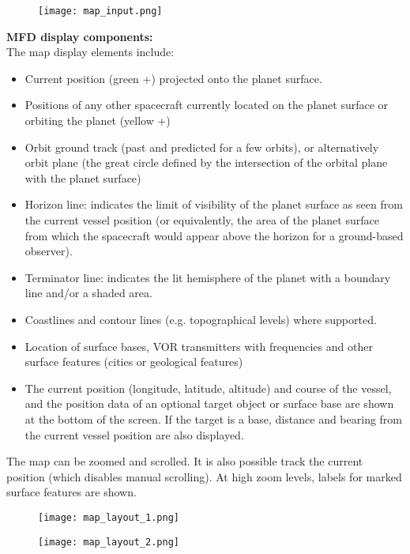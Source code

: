 \documentclass[Orbiter User Manual.tex]{subfiles}
\begin{document}
\begin{figure}[H]
  \centering
  \texttt{[image: map\_input.png]}
\end{figure}

\noindent
\textbf{MFD display components:}\\
The map display elements include:

\begin{itemize}
\item Current position (green +) projected onto the planet surface.
\item Positions of any other spacecraft currently located on the planet surface or orbiting the planet (yellow +)
\item Orbit ground track (past and predicted for a few orbits), or alternatively orbit plane (the great circle defined by the intersection of the orbital plane with the planet surface)
\item Horizon line: indicates the limit of visibility of the planet surface as seen from the current vessel position (or equivalently, the area of the planet surface from which the spacecraft would appear above the horizon for a ground-based observer).
\item Terminator line: indicates the lit hemisphere of the planet with a boundary line and/or a shaded area.
\item Coastlines and contour lines (e.g. topographical levels) where supported.
\item Location of surface bases, VOR transmitters with frequencies and other surface features (cities or geological features)
\item The current position (longitude, latitude, altitude) and course of the vessel, and the position data of an optional target object or surface base are shown at the bottom of the screen. If the target is a base, distance and bearing from the current vessel position are also displayed.
\end{itemize}

\noindent
The map can be zoomed and scrolled. It is also possible track the current position (which disables manual scrolling). At high zoom levels, labels for marked surface features are shown.

\begin{figure}[H]
  \centering
  \texttt{[image: map\_layout\_1.png]}
\end{figure}

\begin{figure}[H]
  \centering
  \texttt{[image: map\_layout\_2.png]}
\end{figure}
\end{document}
